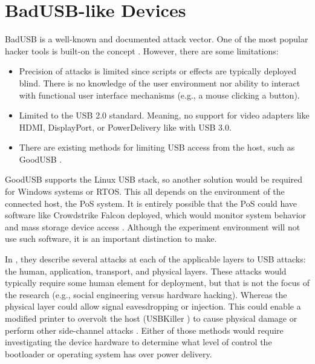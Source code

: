\section{BadUSB-like Devices} \label{badusbdevices}


BadUSB is a well-known and documented attack vector. One of the most popular hacker tools is built-on the concept \autocite{hak5BashBunny}. However, there are some limitations:

\begin{itemize}
  \item Precision of attacks is limited since scripts or effects are typically deployed blind. There is no knowledge of the user environment nor ability to interact with functional user interface mechanisms (e.g., a mouse clicking a button). 
  \item Limited to the USB 2.0 standard. Meaning, no support for video adapters like HDMI, DisplayPort, or PowerDelivery like with USB 3.0. 
  \item There are existing methods for limiting USB access from the host, such as GoodUSB \autocite{tianDefendingMaliciousUSB2015}.
\end{itemize}

GoodUSB supports the Linux USB stack, so another solution would be required for Windows systems or RTOS. This all depends on the environment of the connected host, the PoS system. It is entirely possible that the PoS could have software like Crowdstrike Falcon deployed, which would monitor system behavior and mass storage device access \autocite{backer2021sdn}. Although the experiment environment will not use such software, it is an important distinction to make.

In \autocite*{tianSoKPlugPray2018}, they describe several attacks at each of the applicable layers to USB attacks: the human, application, transport, and physical layers. These attacks would typically require some human element for deployment, but that is not the focus of the research (e.g., social engineering versus hardware hacking). Whereas the physical layer could allow signal eavesdropping or injection. This could enable a modified printer to overvolt the host (USBKiller \autocite{USBKillDevices}) to cause physical damage or perform other side-channel attacks \autocite*{sridharEMIIssuesUniversal2003}. Either of those methods would require investigating the device hardware to determine what level of control the bootloader or operating system has over power delivery.




